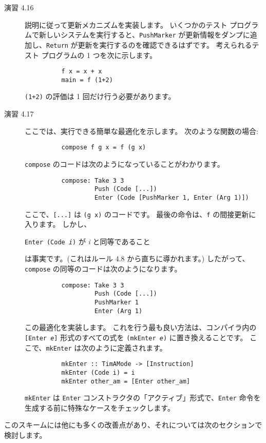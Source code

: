 \documentclass{jarticle}
\begin{document}
\begin{description}
	\item[演習 4.16] 説明に従って更新メカニズムを実装します。
		いくつかのテスト プログラムで新しいシステムを実行すると、\texttt{PushMarker} が更新情報をダンプに追加し、\texttt{Return} が更新を実行するのを確認できるはずです。
		考えられるテスト プログラムの 1 つを次に示します。
		\begin{verbatim}
          f x = x + x
          main = f (1+2)
        \end{verbatim}
		\texttt{(1+2)} の評価は 1 回だけ行う必要があります。
	\item[演習 4.17] ここでは、実行できる簡単な最適化を示します。
		次のような関数の場合:
		\begin{verbatim}
          compose f g x = f (g x)
        \end{verbatim}
		\texttt{compose} のコードは次のようになっていることがわかります。
		\begin{verbatim}
          compose: Take 3 3
                   Push (Code [...])
                   Enter (Code [PushMarker 1, Enter (Arg 1)])
        \end{verbatim}
		ここで、\texttt{[...]} は \texttt{(g x)} のコードです。
		最後の命令は、\texttt{f} の間接更新に入ります。
		しかし、
		\begin{center}
			\texttt{Enter (Code \textit{i})} が \textit{i} と同等であること
		\end{center}
		は事実です。(これはルール 4.8 から直ちに導かれます。)
		したがって、\texttt{compose} の同等のコードは次のようになります。
		\begin{verbatim}
          compose: Take 3 3
                   Push (Code [...])
                   PushMarker 1
                   Enter (Arg 1)
        \end{verbatim}
		この最適化を実装します。
		これを行う最も良い方法は、コンパイラ内の \texttt{[Enter \textit{e}]} 形式のすべての式を \texttt{(mkEnter \textit{e})} に置き換えることです。
		ここで、\texttt{mkEnter} は次のように定義されます。
		\begin{verbatim}
          mkEnter :: TimAMode -> [Instruction]
          mkEnter (Code i) = i
          mkEnter other_am = [Enter other_am]
        \end{verbatim}
		\texttt{mkEnter} は \texttt{Enter} コンストラクタの「アクティブ」形式で、\texttt{Enter} 命令を生成する前に特殊なケースをチェックします。
\end{description}

このスキームには他にも多くの改善点があり、それについては次のセクションで検討します。
\end{document}
